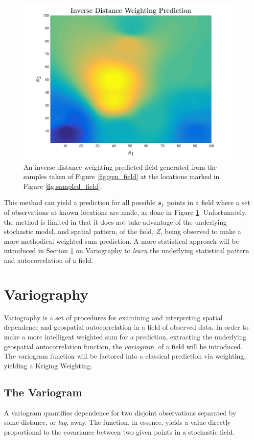 \begin{figure}[ht!]
    \centering
    \includegraphics[width=0.8\linewidth]{figures/idw_predicted_field.png}
    \caption{An inverse distance weighting predicted field generated from the samples taken of Figure \ref{fig:gen_field} at the locations marked in Figure \ref{fig:sampled_field}.}
    \label{fig:idw_field}
\end{figure}

This method can yield a prediction for all possible ${\it{\boldsymbol{s}}}_j$ points in a field where a set of observations at known locations are made, as done in Figure \ref{fig:idw_field}. Unfortunately, the method is limited in that it does not take advantage of the underlying stochastic model, and spatial pattern, of the field, $Z$, being observed to make a more methodical weighted sum prediction. A more statistical approach will be introduced in Section \ref{sec:vario} on Variography to \textit{learn} the underlying statistical pattern and autocorrelation of a field.

\section{Variography} \label{sec:vario}
Variography is a set of procedures for examining and interpreting spatial dependence and geospatial autocorrelation in a field of observed data. In order to make a more intelligent weighted sum for a prediction, extracting the underlying geospatial autocorrelation function, the \textit{variogram}, of a field will be introduced. The variogram function will be factored into a classical prediction via weighting, yielding a Kriging Weighting.

\subsection{The Variogram}
A variogram quantifies dependence for two disjoint observations separated by some distance, or \textit{lag}, away. The function, in essence, yields a value directly proportional to the covariance between two given points in a stochastic field.

